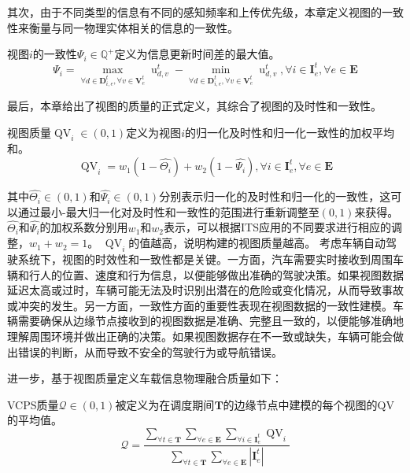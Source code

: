 其次，由于不同类型的信息有不同的感知频率和上传优先级，本章定义视图的一致性来衡量与同一物理实体相关的信息的一致性。
\begin{definition}
视图$i$的一致性$\Psi_{i} \in \mathbb{Q}^{+}$定义为信息更新时间差的最大值。
\begin{equation}
    \Psi_{i}=\max_{\forall d \in \mathbf{D}_{i, e}^{t}, \forall v \in \mathbf{V}_{e}^{t}} {\operatorname{u}_{d, v}^t} - \min_{\forall d \in \mathbf{D}_{i, e}^{t}, \forall v \in \mathbf{V}_{e}^{t}} {\operatorname{u}_{d, v}^t} , \forall i \in \mathbf{I}_{e}^{t}, \forall e \in \mathbf{E}
\end{equation}
\end{definition}

最后，本章给出了视图的质量的正式定义，其综合了视图的及时性和一致性。
\begin{definition}
视图质量$\operatorname{QV}_{i} \in (0, 1)$定义为视图$i$的归一化及时性和归一化一致性的加权平均和。
	\begin{equation}
	    \operatorname{QV}_{i} = w_1 (1 -\hat{\Theta_{i}}) + w_2 (1 - \hat{\Psi_{i}}), \forall i \in \mathbf{I}_{e}^t, \forall e \in \mathbf{E}
	\end{equation}
\end{definition}
\noindent 其中$\hat{\Theta_{i}} \in (0, 1)$和$\hat{\Psi_{i}} \in (0, 1)$分别表示归一化的及时性和归一化的一致性，这可以通过最小-最大归一化对及时性和一致性的范围进行重新调整至$(0, 1)$来获得。
$\hat{\Theta_{i}}$和$\hat{\Psi_{i}}$的加权系数分别用$w_1$和$w_2$表示，可以根据ITS应用的不同要求进行相应的调整，$w_1+w_2=1$。
$\operatorname{QV}_{i}$的值越高，说明构建的视图质量越高。
考虑车辆自动驾驶系统下，视图的时效性和一致性都是关键。一方面，汽车需要实时接收到周围车辆和行人的位置、速度和行为信息，以便能够做出准确的驾驶决策。如果视图数据延迟太高或过时，车辆可能无法及时识别出潜在的危险或变化情况，从而导致事故或冲突的发生。另一方面，一致性方面的重要性表现在视图数据的一致性建模。车辆需要确保从边缘节点接收到的视图数据是准确、完整且一致的，以便能够准确地理解周围环境并做出正确的决策。如果视图数据存在不一致或缺失，车辆可能会做出错误的判断，从而导致不安全的驾驶行为或导航错误。

进一步，基于视图质量定义车载信息物理融合质量如下：
\begin{definition}
VCPS质量$\mathscr{Q} \in (0, 1)$被定义为在调度期间$\mathbf{T}$的边缘节点中建模的每个视图的QV的平均值。
	\begin{equation}
		\mathscr{Q}=\frac{\sum_{\forall t \in \mathbf{T}} \sum_{\forall e \in \mathbf{E}} \sum_{\forall i \in \mathbf{I}_e^t} \operatorname{QV}_{i}}{\sum_{\forall t \in \mathbf{T}} \sum_{\forall e \in \mathbf{E}} |\mathbf{I}_e^t| }
	\end{equation}
\end{definition}

